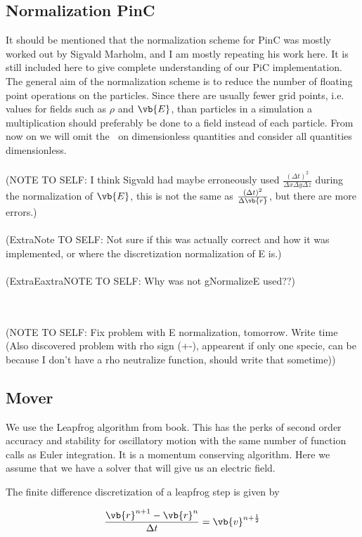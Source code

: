    \subsection{Normalization PinC}
        It should be mentioned that the normalization scheme for PinC was mostly worked
        out by Sigvald Marholm, and I am mostly repeating his work here. It is still
        included here to give complete understanding of our PiC implementation.
        The general aim of the normalization scheme is to reduce the number of
        floating point operations on the particles. Since there are usually
        fewer grid points, i.e. values for fields such as \(\rho\) and \(\vb{E}\),
        than particles in a simulation a multiplication should preferably be done to
        a field instead of each particle. From now on we will omit the \(~\) on dimensionless
        quantities and consider all quantities dimensionless.
\\ \\
        (NOTE TO SELF: I think Sigvald had maybe erroneously used \(\frac{(\Delta t)^2}{\Delta x \Delta y \Delta z}\) during the normalization of
        \(\vb{E}\), this is not the same as \(\frac{(\Delta t)^2}{\Delta \vb{r}}\), but there are more errors.)
\\ \\(ExtraNote TO SELF: Not sure if this was actually correct and how it was implemented, or
        where the discretization normalization of E is.)
\\ \\(ExtraEaxtraNOTE TO SELF: Why was not gNormalizeE used??)

\\ \\ (NOTE TO SELF: Fix problem with E normalization, tomorrow. Write time (Also discovered problem with rho sign (+-), appearent if only
    one specie, can be because I don't have a rho neutralize function, should write that sometime))

        \subsection{Mover}
            We use the Leapfrog algorithm from \textit{} \citep{birdsall_plasma_2004}
            book. This has the perks of second order accuracy and stability for oscillatory motion
            with the same number of function calls as Euler integration. It is
            a momentum conserving algorithm. Here we assume that we have a solver
            that will give us an electric field.

            The finite difference discretization of a leapfrog step is given by

            \begin{equation}
                \frac{\vb{r}^{n+1}-\vb{r}^n}{\Delta t} = \vb{v}^{n+\frac{1}{2}}
            \end{equation}
